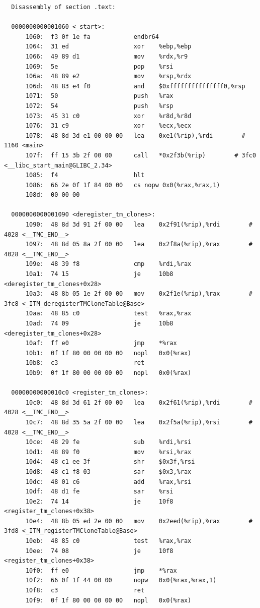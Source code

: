 \documentclass[UTF8,a4paper,10pt]{ctexart}
\begin{document}
\begin{verbatim}
  Disassembly of section .text:
  
  0000000000001060 <_start>:
      1060:  f3 0f 1e fa            endbr64
      1064:  31 ed                  xor    %ebp,%ebp
      1066:  49 89 d1               mov    %rdx,%r9
      1069:  5e                     pop    %rsi
      106a:  48 89 e2               mov    %rsp,%rdx
      106d:  48 83 e4 f0            and    $0xfffffffffffffff0,%rsp
      1071:  50                     push   %rax
      1072:  54                     push   %rsp
      1073:  45 31 c0               xor    %r8d,%r8d
      1076:  31 c9                  xor    %ecx,%ecx
      1078:  48 8d 3d e1 00 00 00   lea    0xe1(%rip),%rdi        # 1160 <main>
      107f:  ff 15 3b 2f 00 00      call   *0x2f3b(%rip)        # 3fc0 <__libc_start_main@GLIBC_2.34>
      1085:  f4                     hlt
      1086:  66 2e 0f 1f 84 00 00   cs nopw 0x0(%rax,%rax,1)
      108d:  00 00 00 
  
  0000000000001090 <deregister_tm_clones>:
      1090:  48 8d 3d 91 2f 00 00   lea    0x2f91(%rip),%rdi        # 4028 <__TMC_END__>
      1097:  48 8d 05 8a 2f 00 00   lea    0x2f8a(%rip),%rax        # 4028 <__TMC_END__>
      109e:  48 39 f8               cmp    %rdi,%rax
      10a1:  74 15                  je     10b8 <deregister_tm_clones+0x28>
      10a3:  48 8b 05 1e 2f 00 00   mov    0x2f1e(%rip),%rax        # 3fc8 <_ITM_deregisterTMCloneTable@Base>
      10aa:  48 85 c0               test   %rax,%rax
      10ad:  74 09                  je     10b8 <deregister_tm_clones+0x28>
      10af:  ff e0                  jmp    *%rax
      10b1:  0f 1f 80 00 00 00 00   nopl   0x0(%rax)
      10b8:  c3                     ret
      10b9:  0f 1f 80 00 00 00 00   nopl   0x0(%rax)
  
  00000000000010c0 <register_tm_clones>:
      10c0:  48 8d 3d 61 2f 00 00   lea    0x2f61(%rip),%rdi        # 4028 <__TMC_END__>
      10c7:  48 8d 35 5a 2f 00 00   lea    0x2f5a(%rip),%rsi        # 4028 <__TMC_END__>
      10ce:  48 29 fe               sub    %rdi,%rsi
      10d1:  48 89 f0               mov    %rsi,%rax
      10d4:  48 c1 ee 3f            shr    $0x3f,%rsi
      10d8:  48 c1 f8 03            sar    $0x3,%rax
      10dc:  48 01 c6               add    %rax,%rsi
      10df:  48 d1 fe               sar    %rsi
      10e2:  74 14                  je     10f8 <register_tm_clones+0x38>
      10e4:  48 8b 05 ed 2e 00 00   mov    0x2eed(%rip),%rax        # 3fd8 <_ITM_registerTMCloneTable@Base>
      10eb:  48 85 c0               test   %rax,%rax
      10ee:  74 08                  je     10f8 <register_tm_clones+0x38>
      10f0:  ff e0                  jmp    *%rax
      10f2:  66 0f 1f 44 00 00      nopw   0x0(%rax,%rax,1)
      10f8:  c3                     ret
      10f9:  0f 1f 80 00 00 00 00   nopl   0x0(%rax)
  

\end{verbatim}
\end{document}

